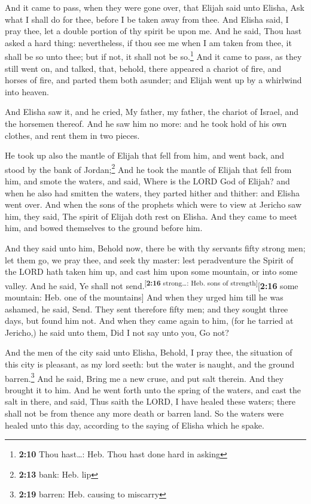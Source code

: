  And it came to pass, when they were gone over, that
Elijah said unto Elisha, Ask what I shall do for thee, before I be taken
away from thee. And Elisha said, I pray thee, let a double portion of
thy spirit be upon me.  And he said, Thou hast asked a
hard thing: nevertheless, if thou see me when I am taken from thee, it
shall be so unto thee; but if not, it shall not be so.\footnote{\textbf{2:10}
  Thou hast\ldots: Heb. Thou hast done hard in asking} 
And it came to pass, as they still went on, and talked, that, behold,
there appeared a chariot of fire, and horses of fire, and parted them
both asunder; and Elijah went up by a whirlwind into heaven.

 And Elisha saw it, and he cried, My father, my father,
the chariot of Israel, and the horsemen thereof. And he saw him no more:
and he took hold of his own clothes, and rent them in two pieces.

 He took up also the mantle of Elijah that fell from him,
and went back, and stood by the bank of Jordan;\footnote{\textbf{2:13}
  bank: Heb. lip}  And he took the mantle of Elijah that
fell from him, and smote the waters, and said, Where is the LORD God of
Elijah? and when he also had smitten the waters, they parted hither and
thither: and Elisha went over.  And when the sons of the
prophets which were to view at Jericho saw him, they said, The spirit of
Elijah doth rest on Elisha. And they came to meet him, and bowed
themselves to the ground before him.

 And they said unto him, Behold now, there be with thy
servants fifty strong men; let them go, we pray thee, and seek thy
master: lest peradventure the Spirit of the LORD hath taken him up, and
cast him upon some mountain, or into some valley. And he said, Ye shall
not send.\textsuperscript{{[}\textbf{2:16} strong\ldots: Heb. sons of
strength{]}}{[}\textbf{2:16} some mountain: Heb. one of the mountains{]}
 And when they urged him till he was ashamed, he said,
Send. They sent therefore fifty men; and they sought three days, but
found him not.  And when they came again to him, (for he
tarried at Jericho,) he said unto them, Did I not say unto you, Go not?

 And the men of the city said unto Elisha, Behold, I pray
thee, the situation of this city is pleasant, as my lord seeth: but the
water is naught, and the ground barren.\footnote{\textbf{2:19} barren:
  Heb. causing to miscarry}  And he said, Bring me a new
cruse, and put salt therein. And they brought it to him. 
And he went forth unto the spring of the waters, and cast the salt in
there, and said, Thus saith the LORD, I have healed these waters; there
shall not be from thence any more death or barren land. 
So the waters were healed unto this day, according to the saying of
Elisha which he spake.

